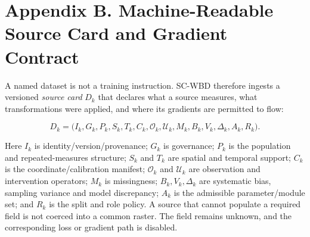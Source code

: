 \clearpage
\section{Appendix B. Machine-Readable Source Card and Gradient Contract}

A named dataset is not a training instruction. SC-WBD therefore ingests a
versioned \emph{source card} \(D_k\) that declares what a source measures, what
transformations were applied, and where its gradients are permitted to flow:

\[
D_k=\bigl(I_k,G_k,P_k,S_k,T_k,C_k,\mathcal O_k,\mathcal U_k,
M_k,B_k,V_k,\Delta_k,A_k,R_k\bigr).
\]

Here \(I_k\) is identity/version/provenance; \(G_k\) is governance;
\(P_k\) is the population and repeated-measures structure; \(S_k\) and \(T_k\)
are spatial and temporal support; \(C_k\) is the coordinate/calibration
manifest; \(\mathcal O_k\) and \(\mathcal U_k\) are observation and
intervention operators; \(M_k\) is missingness; \(B_k,V_k,\Delta_k\) are
systematic bias, sampling variance and model discrepancy; \(A_k\) is the
admissible parameter/module set; and \(R_k\) is the split and role policy. A
source that cannot populate a required field is not coerced into a common
raster. The field remains unknown, and the corresponding loss or gradient
path is disabled.

